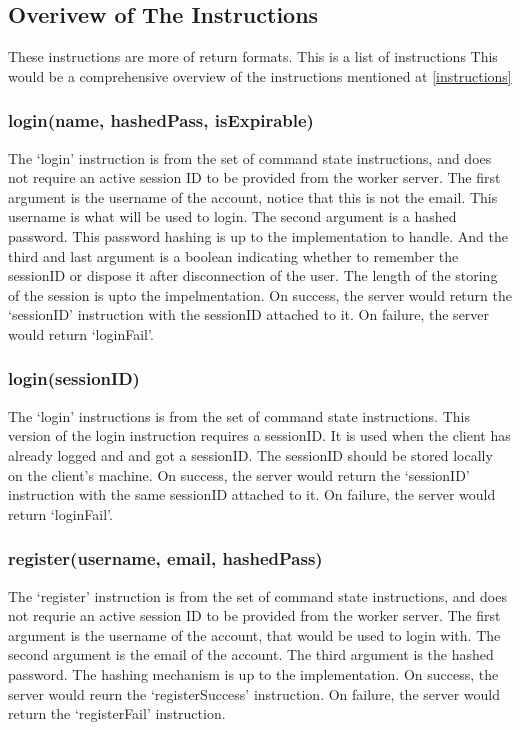 \documentclass[a4paper]{article}
\begin{document}
\subsection{Overivew of The Instructions}
\label{protocol_inst_overview}
These instructions are more of return formats. This is a list of instructions 
This would be a comprehensive overview of the instructions mentioned at
\ref{instructions} 

\subsubsection{login(name, hashedPass, isExpirable)}
\label{protocol_inst_login1}
The `login' instruction is from the set of command state instructions, and does
not require an active session ID to be provided from the worker server. The
first argument is the username of the account, notice that this is not the
email. This username is what will be used to login. The second argument is a
hashed password. This password hashing is up to the implementation to handle.
And the third and last argument is a boolean indicating whether to remember the
sessionID or dispose it after disconnection of the user. The length of the
storing of the session is upto the impelmentation. On success, the server would
return the `sessionID' instruction with the sessionID attached to it. On 
failure, the server would return `loginFail'.

\subsubsection{login(sessionID)}
\label{protocol_inst_login2}
The `login' instructions is from the set of command state instructions. This
version of the login instruction requires a sessionID. It is used when the
client has already logged and and got a sessionID. The sessionID should be
stored locally on the client's machine. On success, the server would return the
`sessionID' instruction with the same sessionID attached to it. On failure, the
server would return `loginFail'.

\subsubsection{register(username, email, hashedPass)}
\label{protocol_inst_register}
The `register' instruction is from the set of command state instructions, and
does not requrie an active session ID to be provided from the worker server.
The first argument is the username of the account, that would be used to login
with. The second argument is the email of the account. The third argument is
the hashed password. The hashing mechanism is up to the implementation. On
success, the server would reurn the `registerSuccess' instruction. On failure,
the server would return the `registerFail' instruction.
\end{document}
